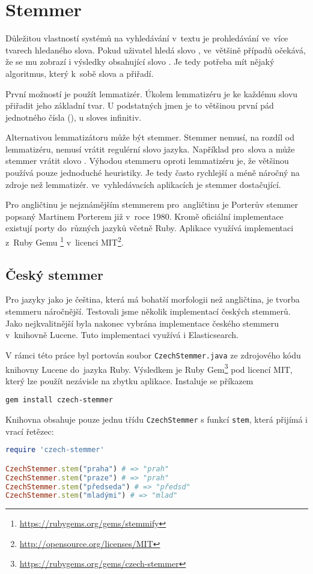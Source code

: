 \chapter{Stemmer}
\label{chap:stemmer}

Důležitou vlastností systémů na vyhledávání v~textu je prohledávání ve~více tvarech hledaného slova. Pokud uživatel hledá slovo , ve~většině případů očekává, že se mu zobrazí i výsledky obsahující slovo . Je tedy potřeba mít nějaký algoritmus, který k~sobě slova  a  přiřadí.

První možností je použít lemmatizér\cite{manning}. Úkolem lemmatizéru je ke každému slovu přiřadit jeho základní tvar. U podstatných jmen je to většinou první pád jednotného čísla (), u sloves infinitiv.

Alternativou lemmatizátoru může být stemmer. Stemmer nemusí, na rozdíl od lemmatizéru, nemusí vrátit regulérní slovo jazyka. Například pro~slova  a  může stemmer vrátit slovo . Výhodou stemmeru oproti lemmatizéru je, že většinou používá pouze jednoduché heuristiky. Je tedy často rychlejší a méně náročný na zdroje než lemmatizér. ve~vyhledávacích aplikacích je stemmer dostačující.

Pro angličtinu je nejznámějším stemmerem pro~angličtinu je Porterův stemmer\cite{porter80} popsaný Martinem Porterem již v~roce 1980. Kromě oficiální implementace existují porty do~různých jazyků včetně Ruby\cite{ruby}. Aplikace využívá implementaci z~Ruby Gemu \footnote{\url{https://rubygems.org/gems/stemmify}} v~licenci MIT\footnote{\url{http://opensource.org/licenses/MIT}}.


\section{Český stemmer}
Pro jazyky jako je čeština, která má bohatší morfologii než angličtina, je tvorba stemmeru náročnější. Testovali jsme několik implementací českých stemmerů. Jako nejkvalitnější byla nakonec vybrána implementace českého stemmeru v~knihovně Lucene\cite{lucene}. Tuto implementaci využívá i Elasticsearch\cite{elasticsearch}.

V rámci této práce byl portován soubor \lstinline{CzechStemmer.java} ze zdrojového kódu knihovny Lucene do~jazyka Ruby. Výsledkem je Ruby Gem\footnote{\url{https://rubygems.org/gems/czech-stemmer}} pod licencí MIT, který lze použít nezávisle na zbytku aplikace. Instaluje se příkazem

\begin{lstlisting}
gem install czech-stemmer
\end{lstlisting}

Knihovna obsahuje pouze jednu třídu \lstinline{CzechStemmer} s funkcí \lstinline{stem}, která přijímá i vrací řetězec:

\begin{lstlisting}[language=ruby]
require 'czech-stemmer'

CzechStemmer.stem("praha") # => "prah"
CzechStemmer.stem("praze") # => "prah"
CzechStemmer.stem("předseda") # => "předsd"
CzechStemmer.stem("mladými") # => "mlad"
\end{lstlisting}

